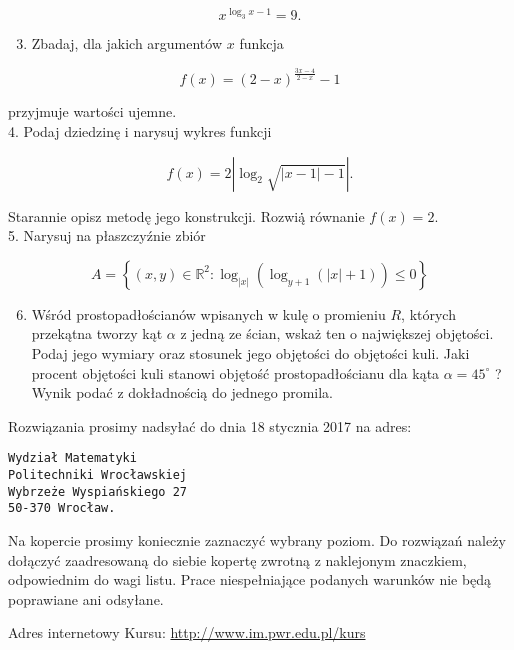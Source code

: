 \documentclass[10pt]{article}
\begin{document}
$$
x^{\log _{3} x-1}=9 .
$$

\begin{enumerate}
  \setcounter{enumi}{2}
  \item Zbadaj, dla jakich argumentów $x$ funkcja
\end{enumerate}

$$
f(x)=(2-x)^{\frac{3 x-4}{2-x}}-1
$$

przyjmuje wartości ujemne.\\
4. Podaj dziedzinę i narysuj wykres funkcji

$$
f(x)=2\left|\log _{2} \sqrt{|x-1|-1}\right| .
$$

Starannie opisz metodę jego konstrukcji. Rozwią̇̇ równanie $f(x)=2$.\\
5. Narysuj na płaszczyźnie zbiór

$$
A=\left\{(x, y) \in \mathbb{R}^{2}: \log _{|x|}\left(\log _{y+1}(|x|+1)\right) \leqslant 0\right\}
$$

\begin{enumerate}
  \setcounter{enumi}{5}
  \item Wśród prostopadłościanów wpisanych w kulę o promieniu $R$, których przekątna tworzy kąt $\alpha$ z jedną ze ścian, wskaż ten o największej objętości. Podaj jego wymiary oraz stosunek jego objętości do objętości kuli. Jaki procent objętości kuli stanowi objętość prostopadłościanu dla kąta $\alpha=45^{\circ}$ ? Wynik podać z dokładnością do jednego promila.
\end{enumerate}

Rozwiązania prosimy nadsyłać do dnia 18 stycznia 2017 na adres:

\begin{verbatim}
Wydział Matematyki
Politechniki Wrocławskiej
Wybrzeże Wyspiańskiego 27
50-370 Wrocław.
\end{verbatim}

Na kopercie prosimy koniecznie zaznaczyć wybrany poziom. Do rozwiązań należy dołączyć zaadresowaną do siebie kopertę zwrotną z naklejonym znaczkiem, odpowiednim do wagi listu. Prace niespełniające podanych warunków nie będą poprawiane ani odsyłane.

Adres internetowy Kursu: \href{http://www.im.pwr.edu.pl/kurs}{http://www.im.pwr.edu.pl/kurs}
\end{document}
